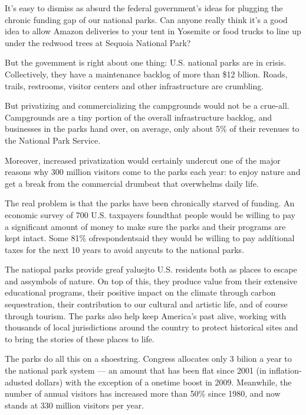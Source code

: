 It's easy to dismiss as absurd the federal government's ideas for plugging the chronic funding gap of our national parks. Can anyone really think it's a good idea to allow Amazon deliveries to your tent in Yosemite or food trucks to line up under the redwood trees at Sequoia National Park?


But the govemment is right about one thing: U.S. national parks are in crisis. Collectively, they have a maintenance backlog of more than \$12 bllion. Roads, trails, restrooms, visitor centers and other infrastructure are crumbling.


But privatizing and commercializing the campgrounds would not be a crue-all. Campgrounds are a tiny portion of the overall infrastructure backlog, and businesses in the parks hand over, on average, only about 5\% of their revenues to the National Park Service.


Moreover, increased privatization would certainly undercut one of the major reasons why 300 million visitors come to the parks each year: to enjoy nature and get a break from the commercial drumbeat that overwhelms daily life.


The real problem is that the parks have been chronically starved of funding. An economic survey of 700 U.S. taxpayers foundthat people would be willing to pay a significant amount of money to make sure the parks and their programs are kept intact. Some 81\% ofrespondentsaid they would be willing to pay addítional taxes for the next 10 years to avoid anycuts to the national parks.


The natiopal parks provide greaf yaluejto U.S. residents both as places to escape and assymbols of nature. On top of this, they produce value from their extensive educational programs, their positive impact on the climate through carbon sequestration, their contribution to our cultural and artistic life, and of course through tourism. The parks also help keep America's past alive, working with thousands of local jurisdictions around the country to protect historical sites and to bring the stories of these places to life.


The parks do all this on a shoestring. Congress allocates only 3 bilion a year to the national park system — an amount that has been flat since 2001 (in inflation-adusted dollars) with the exception of a onetime boost in 2009. Meanwhile, the number of annual visitors has increased more than 50\% since 1980, and now stands at 330 million visitors per year.